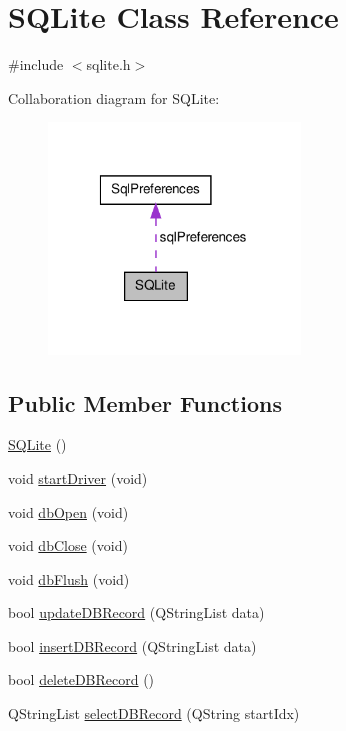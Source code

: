 \hypertarget{classSQLite}{\section{\-S\-Q\-Lite \-Class \-Reference}
\label{classSQLite}
}


{\ttfamily \#include $<$sqlite.\-h$>$}



\-Collaboration diagram for \-S\-Q\-Lite\-:\nopagebreak
\begin{figure}[H]
\begin{center}
\leavevmode
\includegraphics[width=190pt]{classSQLite__coll__graph}
\end{center}
\end{figure}
\subsection*{\-Public \-Member \-Functions}
\begin{DoxyCompactItemize}
\item 
\hyperlink{classSQLite_ae7b35dc7e3c41543a0acde669ad4ba0d}{\-S\-Q\-Lite} ()
\item 
void \hyperlink{classSQLite_ad04b99dcc053d1ad1fe034a7d33ddc45}{start\-Driver} (void)
\item 
void \hyperlink{classSQLite_a84d9c5795ea328449772de77bfd9e30e}{db\-Open} (void)
\item 
void \hyperlink{classSQLite_a846367e96132826f56b96515a2c1d8ab}{db\-Close} (void)
\item 
void \hyperlink{classSQLite_a245861da7b78b4adb356e552bd3b2286}{db\-Flush} (void)
\item 
bool \hyperlink{classSQLite_acd343255f8010fdde87b1d8b2cd65e49}{update\-D\-B\-Record} (\-Q\-String\-List data)
\item 
bool \hyperlink{classSQLite_aa4a76c8a9ec7d8a0101a28c228701e4b}{insert\-D\-B\-Record} (\-Q\-String\-List data)
\item 
bool \hyperlink{classSQLite_ae740e848da37fb08e92d2e7db3b508b7}{delete\-D\-B\-Record} ()
\item 
\-Q\-String\-List \hyperlink{classSQLite_a7c04908029911f3df653b673b3ee6e84}{select\-D\-B\-Record} (\-Q\-String start\-Idx)
\end{DoxyCompactItemize}
